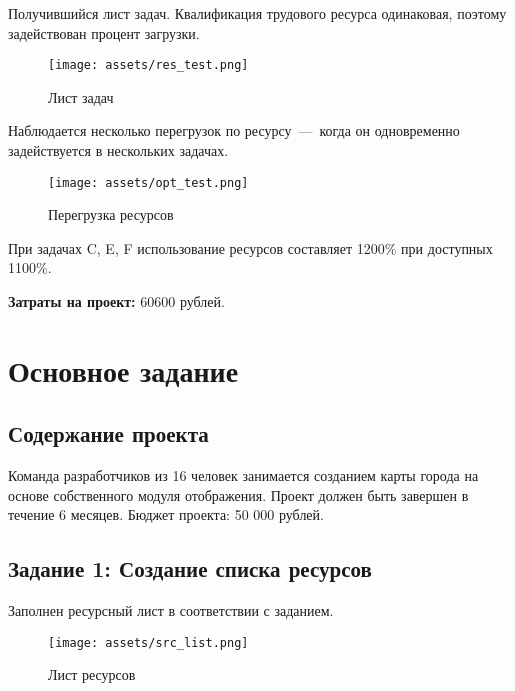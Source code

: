 Получившийся лист задач. Квалификация трудового ресурса одинаковая, поэтому задействован процент загрузки.

\begin{figure}[H]
    \begin{center}
    \texttt{[image: assets/res\_test.png]}
    \caption{Лист задач}
    \label{fig:2}
    \end{center}
\end{figure}

Наблюдается несколько перегрузок по ресурсу~---~когда он одновременно задействуется в нескольких задачах. 

\begin{figure}[H]
    \begin{center}
    \texttt{[image: assets/opt\_test.png]}
    \caption{Перегрузка ресурсов}
    \label{fig:2}
    \end{center}
\end{figure}

При задачах C, E, F использование ресурсов составляет 1200\% при доступных 1100\%.

\textbf{Затраты на проект:} 60600 рублей.
















\chapter{Основное задание}

\section{Содержание проекта}

Команда разработчиков из 16 человек занимается созданием карты города на основе собственного модуля отображения. Проект должен быть завершен в течение 6 месяцев. Бюджет проекта: 50 000 рублей.

\section{Задание 1: Создание списка ресурсов}

Заполнен ресурсный лист в соответствии с заданием. 

\begin{figure}[H]
    \begin{center}
    \texttt{[image: assets/src\_list.png]}
    \caption{Лист ресурсов}
    \label{fig:2}
    \end{center}
\end{figure}

